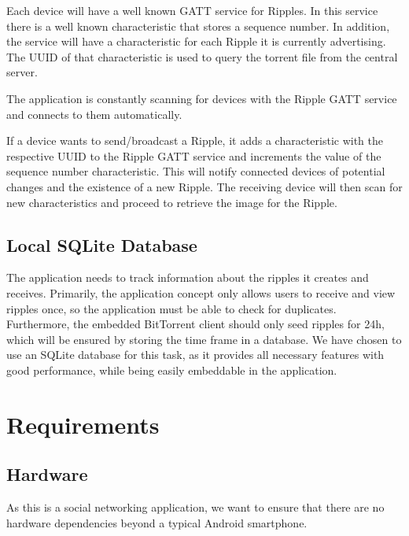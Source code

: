 \documentclass{report}
\begin{document}
Each device will have a well known GATT service for Ripples. In this service there is a well known characteristic that stores a sequence number. In addition, the service will have a characteristic for each Ripple it is currently advertising. The UUID of that characteristic is used to query the torrent file from the central server.

The application is constantly scanning for devices with the Ripple GATT service and connects to them automatically.

If a device wants to send/broadcast a Ripple, it adds a characteristic with the respective UUID to the Ripple GATT service and increments the value of the sequence number characteristic. This will notify connected devices of potential changes and the existence of a new Ripple. The receiving device will then scan for new characteristics and proceed to retrieve the image for the Ripple.

\subsection{Local SQLite Database}
The application needs to track information about the ripples it creates and receives. Primarily, the application concept only allows users to receive and view ripples once, so the application must be able to check for duplicates. Furthermore, the embedded BitTorrent client should only seed ripples for 24h, which will be ensured by storing the time frame in a database.
We have chosen to use an SQLite database for this task, as it provides all necessary features with good performance, while being easily embeddable in the application.

\section{Requirements}

\subsection{Hardware}
As this is a social networking application, we want to ensure that there are no hardware dependencies beyond a typical Android smartphone.
\end{document}
